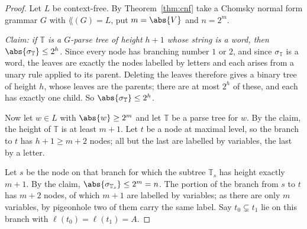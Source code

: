 \begin{proof}
	Let $L$ be context-free. By Theorem~\ref{thm:cnf} take a Chomsky normal form grammar $G$ with $\lang(G) = L$, put $m = \abs{V}$ and $n = 2^m$.

	\emph{Claim: if $\mathbb T$ is a $G$-parse tree of height $h+1$ whose string is a word, then $\abs{\sigma_{\mathbb T}} \leq 2^h$.} Since every node has branching number $1$ or $2$, and since $\sigma_{\mathbb T}$ is a word, the leaves are exactly the nodes labelled by letters and each arises from a unary rule applied to its parent. Deleting the leaves therefore gives a binary tree of height $h$, whose leaves are the parents; there are at most $2^h$ of these, and each has exactly one child. So $\abs{\sigma_{\mathbb T}} \leq 2^h$.

	Now let $w \in L$ with $\abs{w} \geq 2^m$ and let $\mathbb T$ be a parse tree for $w$. By the claim, the height of $\mathbb T$ is at least $m+1$. Let $t$ be a node at maximal level, so the branch to $t$ has $h+1 \geq m+2$ nodes; all but the last are labelled by variables, the last by a letter.

	Let $s$ be the node on that branch for which the subtree $\mathbb T_s$ has height exactly $m+1$. By the claim, $\abs{\sigma_{\mathbb T_s}} \leq 2^m = n$. The portion of the branch from $s$ to $t$ has $m+2$ nodes, of which $m+1$ are labelled by variables; as there are only $m$ variables, by pigeonhole two of them carry the same label. Say $t_0 \subsetneq t_1$ lie on this branch with $\ell(t_0) = \ell(t_1) = A$.


\end{proof}
